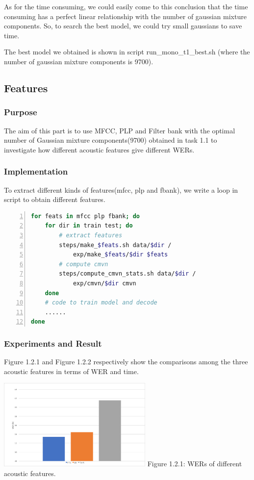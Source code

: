 \documentclass[]{article}
\begin{document}
\begin{multicols*}{2}
As for the time consuming, we could easily come to this conclusion that the time consuming has a perfect linear relationship with the number of gaussian mixture components. So, to search the best model, we could try small gaussians to save time.

The best model we obtained is shown in script run\_mono\_t1\_best.sh (where the number of gaussian mixture components is 9700).

\subsection{Features}
\subsubsection{Purpose}
The aim of this part is to use MFCC, PLP and Filter bank with the optimal number of Gaussian mixture components(9700) obtained in task 1.1 to investigate how different acoustic features give different WERs. 

\subsubsection{Implementation}
To extract different kinds of features(mfcc, plp and fbank), we write a loop in script to obtain different features.

\begin{lstlisting}[language=sh,showstringspaces=false,numbers=left,tabsize=4, xleftmargin=\parindent, frame=single, basicstyle=\tiny] 
for feats in mfcc plp fbank; do
	for dir in train test; do
		# extract features
		steps/make_$feats.sh data/$dir /
			exp/make_$feats/$dir $feats
		# compute cmvn
		steps/compute_cmvn_stats.sh data/$dir /
			exp/cmvn/$dir cmvn
	done	
	# code to train model and decode
	......
done

\end{lstlisting}

\subsubsection{Experiments and Result}
Figure 1.2.1 and Figure 1.2.2 respectively show the comparisons among the three acoustic features in terms of WER and time.

\begin{center}
\includegraphics[width=3in]{Picture2.png} 
Figure 1.2.1: WERs of different acoustic features.
\end{center}


\end{multicols*}
\end{document}
